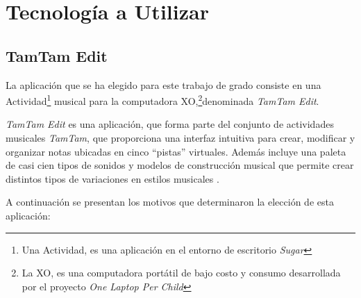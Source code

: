\section{Tecnolog\'ia a Utilizar}
\label{sec:tecnologia-utilizada}

\subsection{TamTam Edit}

La aplicaci\'on que se ha elegido para este trabajo de grado consiste en una
Actividad\footnote{Una Actividad, es una aplicaci\'on en el entorno de escritorio \emph{Sugar}}
musical para la
computadora
XO,\footnote{La XO, es una computadora port\'atil de bajo costo y consumo desarrollada por el proyecto \emph{One Laptop Per Child}}denominada \emph{TamTam Edit}.

\emph{TamTam Edit} es una aplicaci\'on, que forma parte del conjunto de actividades musicales \emph{TamTam}, que proporciona
una interfaz intuitiva para crear, modificar y organizar notas ubicadas en cinco ``pistas'' virtuales. Adem\'as incluye una paleta de
casi cien tipos de sonidos y modelos de construcci\'on musical que permite crear distintos tipos de variaciones en estilos
musicales \cite{TamTamWiki}.

A continuaci\'on se presentan los motivos que determinaron la elecci\'on de esta aplicaci\'on:

